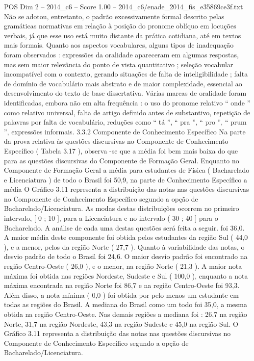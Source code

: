 \begin{textsample}{POS Dim 2 – 2014\_c6 – Score 1.00 – 2014\_c6/enade\_2014\_fis\_e35869ce3f.txt}
Não se adotou, entretanto, o padrão excessivamente formal descrito pelas gramáticas normativas em relação à posição do pronome oblíquo em locuções verbais, já que esse uso está muito distante da prática cotidiana, até em textos mais formais.
Quanto aos aspectos vocabulares, alguns tipos de inadequação foram observados : expressões da oralidade apareceram em algumas respostas, mas sem maior relevância do ponto de vista quantitativo ; seleção vocabular incompatível com o contexto, gerando situações de falta de inteligibilidade ; falta de domínio de vocabulário mais abstrato e de maior complexidade, essencial ao desenvolvimento do texto de base dissertativa.
Várias marcas de oralidade foram identificadas, embora não em alta frequência : o uso do pronome relativo “ onde ” como relativo universal, falta de artigo definido antes de substantivo, repetição de palavras por falta de vocabulário, reduções como “ tá ”, “ pra ”, “ pro ”, “ prum ”, expressões informais. 3.3.2 Componente de Conhecimento Específico Na parte da prova relativa às questões discursivas no Componente de Conhecimento Específico ( Tabela 3.17 ), observa -se que a média foi bem mais baixa do que para as questões discursivas do Componente de Formação Geral.
Enquanto no Componente de Formação Geral a média para estudantes de Física ( Bacharelado e Licenciatura ) de todo o Brasil foi 50,9, na parte de Conhecimento Específico a média O Gráfico 3.11 representa a distribuição das notas nas questões discursivas no Componente de Conhecimento Específico segundo a opção de Bacharelado/Licenciatura.
As modas destas distribuições ocorrem no primeiro intervalo, [ 0 ; 10 ], para a Licenciatura e no intervalo ( 30 ; 40 ] para o Bacharelado.
A análise de cada uma destas questões será feita a seguir. foi 36,0.
A maior média deste componente foi obtida pelos estudantes da região Sul ( 44,0 ), e a menor, pelos da região Norte ( 27,7 ).
Quanto à variabilidade das notas, o desvio padrão de todo o Brasil foi 24,6.
O maior desvio padrão foi encontrado na região Centro-Oeste ( 26,0 ), e o menor, na região Norte ( 21,3 ).
A maior nota máxima foi obtida nas regiões Nordeste, Sudeste e Sul ( 100,0 ), enquanto a nota máxima encontrada na região Norte foi 86,7 e na região Centro-Oeste foi 93,3.
Além disso, a nota mínima ( 0,0 ) foi obtida por pelo menos um estudante em todas as regiões do Brasil.
A mediana do Brasil como um todo foi 35,0, a mesma obtida na região Centro-Oeste.
Nas demais regiões a mediana foi : 26,7 na região Norte, 31,7 na região Nordeste, 43,3 na região Sudeste e 45,0 na região Sul.
O Gráfico 3.11 representa a distribuição das notas nas questões discursivas no Componente de Conhecimento Específico segundo a opção de Bacharelado/Licenciatura.

\end{textsample}
